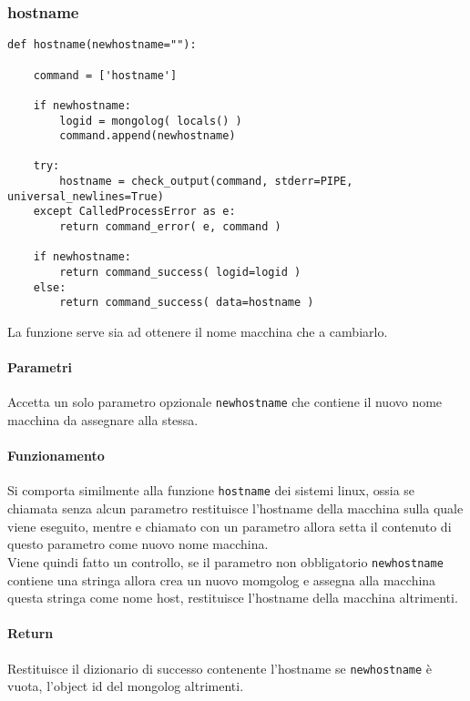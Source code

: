 \documentclass[11pt]{article}
\begin{document}
\subsubsection{hostname}\label{hostname}
\begin{lstlisting}
def hostname(newhostname=""):
    
    command = ['hostname']
        
    if newhostname:
        logid = mongolog( locals() )
        command.append(newhostname)

    try:
        hostname = check_output(command, stderr=PIPE, universal_newlines=True)
    except CalledProcessError as e:
        return command_error( e, command )

    if newhostname:
        return command_success( logid=logid )
    else:
        return command_success( data=hostname )
\end{lstlisting}
La funzione serve sia ad ottenere il nome macchina che a cambiarlo.
\paragraph{Parametri}
Accetta un solo parametro opzionale \texttt{newhostname} che contiene il nuovo nome macchina da assegnare alla stessa.
\paragraph{Funzionamento}
Si comporta similmente alla funzione \texttt{hostname} dei sistemi linux, ossia se chiamata senza alcun parametro
restituisce l'hostname della macchina sulla quale viene eseguito, mentre e chiamato con un parametro allora setta
il contenuto di questo parametro come nuovo nome macchina.\\
Viene quindi fatto un controllo, se il parametro non obbligatorio \texttt{newhostname} contiene una stringa
allora crea un nuovo momgolog e assegna alla macchina questa stringa come nome host, restituisce l'hostname
della macchina altrimenti.
\paragraph{Return}
Restituisce il dizionario di successo contenente l'hostname se \texttt{newhostname} è vuota, l'object id
del mongolog altrimenti.
\end{document}
